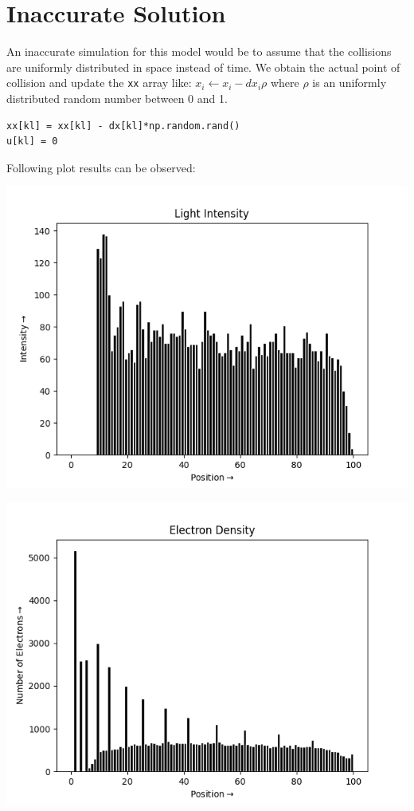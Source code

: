 \documentclass[12pt, a4paper]{report}
\begin{document}
\section*{Inaccurate Solution}
An inaccurate simulation for this model would be to assume that the collisions are uniformly distributed in space instead of time. We obtain the actual point of collision and update the \texttt{xx} array like: $x_i \leftarrow x_i-dx_i \rho$ where $\rho$ is an uniformly distributed random number between 0 and 1.

\begin{verbatim}
xx[kl] = xx[kl] - dx[kl]*np.random.rand()
u[kl] = 0
\end{verbatim}
Following plot results can be observed:
\begin{center}
	\includegraphics[scale=0.70]{Figure_4} 
	\label{fig:rawdata}
\end{center}
\begin{center}
	\includegraphics[scale=0.70]{Figure_5} 
	\label{fig:rawdata}
\end{center}
\end{document}
